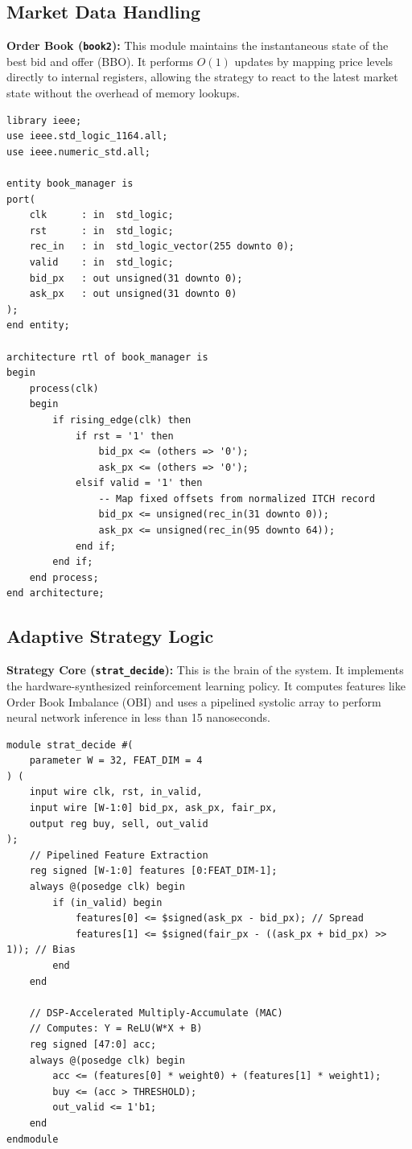 \subsection{Market Data Handling}
\textbf{Order Book (\texttt{book2}):} This module maintains the instantaneous state of the best bid and offer (BBO). It performs $O(1)$ updates by mapping price levels directly to internal registers, allowing the strategy to react to the latest market state without the overhead of memory lookups.

\begin{lstlisting}[style=vhdlstyle, caption={Two-level book update logic}, label={lst:book_a}]
library ieee;
use ieee.std_logic_1164.all;
use ieee.numeric_std.all;

entity book_manager is
port(
    clk      : in  std_logic;
    rst      : in  std_logic;
    rec_in   : in  std_logic_vector(255 downto 0);
    valid    : in  std_logic;
    bid_px   : out unsigned(31 downto 0);
    ask_px   : out unsigned(31 downto 0)
);
end entity;

architecture rtl of book_manager is
begin
    process(clk)
    begin
        if rising_edge(clk) then
            if rst = '1' then
                bid_px <= (others => '0');
                ask_px <= (others => '0');
            elsif valid = '1' then
                -- Map fixed offsets from normalized ITCH record
                bid_px <= unsigned(rec_in(31 downto 0));
                ask_px <= unsigned(rec_in(95 downto 64));
            end if;
        end if;
    end process;
end architecture;
\end{lstlisting}

\subsection{Adaptive Strategy Logic}
\textbf{Strategy Core (\texttt{strat\_decide}):} This is the brain of the system. It implements the hardware-synthesized reinforcement learning policy. It computes features like Order Book Imbalance (OBI) and uses a pipelined systolic array to perform neural network inference in less than 15 nanoseconds.

\begin{lstlisting}[style=verilogstyle, caption={Systolic array for AI policy inference}, label={lst:strategy_a}]
module strat_decide #(
    parameter W = 32, FEAT_DIM = 4
) (
    input wire clk, rst, in_valid,
    input wire [W-1:0] bid_px, ask_px, fair_px,
    output reg buy, sell, out_valid
);
    // Pipelined Feature Extraction
    reg signed [W-1:0] features [0:FEAT_DIM-1];
    always @(posedge clk) begin
        if (in_valid) begin
            features[0] <= $signed(ask_px - bid_px); // Spread
            features[1] <= $signed(fair_px - ((ask_px + bid_px) >> 1)); // Bias
        end
    end

    // DSP-Accelerated Multiply-Accumulate (MAC)
    // Computes: Y = ReLU(W*X + B)
    reg signed [47:0] acc;
    always @(posedge clk) begin
        acc <= (features[0] * weight0) + (features[1] * weight1);
        buy <= (acc > THRESHOLD);
        out_valid <= 1'b1;
    end
endmodule
\end{lstlisting}

